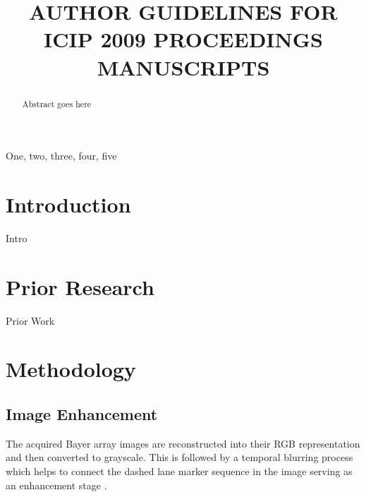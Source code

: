 \documentclass{article}
\title{AUTHOR GUIDELINES FOR ICIP 2009 PROCEEDINGS MANUSCRIPTS}
\begin{document}
%
\maketitle
%
\begin{abstract}
Abstract goes here
\end{abstract}
%
\begin{keywords}
One, two, three, four, five
\end{keywords}
%
\section{Introduction}
\label{sec:intro}
Intro

\section{Prior Research}
\label{sec:prior}
Prior Work

\section{Methodology}
\label{sec:methodology}

\subsection{Image Enhancement}
The acquired Bayer array images are reconstructed into their RGB representation and then converted to grayscale. This is followed by a temporal blurring process which helps to connect the dashed lane marker sequence in the image serving as an enhancement stage \cite{borkar_layered_2009}.
\end{document}
